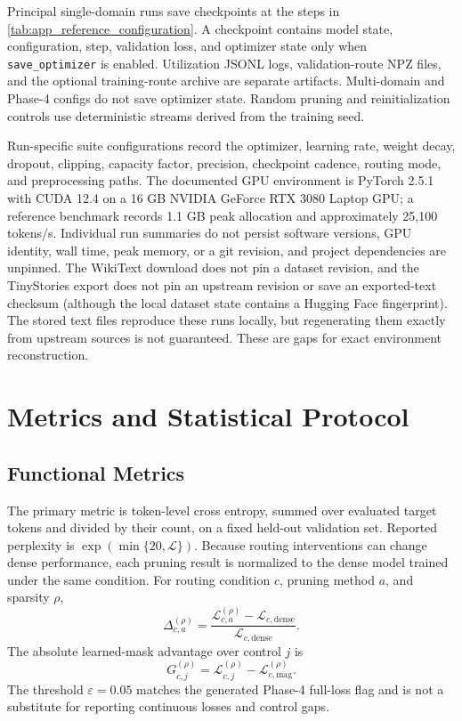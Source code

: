 \documentclass{article}
\begin{document}
Principal single-domain runs save checkpoints at the steps in
\cref{tab:app_reference_configuration}. A checkpoint contains model state,
configuration, step, validation loss, and optimizer state only when
\texttt{save\_optimizer} is enabled. Utilization JSONL logs, validation-route
NPZ files, and the optional training-route archive are separate artifacts.
Multi-domain and Phase-4 configs do not save optimizer state. Random pruning and
reinitialization controls use deterministic streams derived from the training
seed.

Run-specific suite configurations record the optimizer, learning rate, weight
decay, dropout, clipping, capacity factor, precision, checkpoint cadence,
routing mode, and preprocessing paths. The documented GPU environment is
PyTorch 2.5.1 with CUDA 12.4 on a 16 GB NVIDIA GeForce RTX 3080 Laptop GPU; a
reference benchmark records 1.1 GB peak allocation and approximately 25,100
tokens/s. Individual run summaries do not persist software versions, GPU
identity, wall time, peak memory, or a git revision, and project dependencies
are unpinned. The WikiText download does not pin a dataset revision, and the
TinyStories export does not pin an upstream revision or save an exported-text
checksum (although the local dataset state contains a Hugging Face
fingerprint). The
stored text files reproduce these runs locally, but regenerating them exactly
from upstream sources is not guaranteed. These are gaps for exact environment
reconstruction.

\section{Metrics and Statistical Protocol}
\label{app:metrics}

\subsection{Functional Metrics}

The primary metric is token-level cross entropy, summed over evaluated target
tokens and divided by their count, on a fixed held-out validation set. Reported
perplexity is $\exp(\min\{20,\mathcal L\})$. Because routing interventions can
change dense performance, each pruning
result is normalized to the dense model trained under the same condition. For
routing condition $c$, pruning method $a$, and sparsity $\rho$,
\begin{equation}
\Delta_{c,a}^{(\rho)}
=
\frac{
\mathcal{L}_{c,a}^{(\rho)}
-
\mathcal{L}_{c,\mathrm{dense}}
}{
\mathcal{L}_{c,\mathrm{dense}}
}.
\label{eq:app_relative_gap}
\end{equation}
The absolute learned-mask advantage over control $j$ is
\begin{equation}
G_{c,j}^{(\rho)}
=
\mathcal{L}_{c,j}^{(\rho)}
-
\mathcal{L}_{c,\mathrm{mag}}^{(\rho)}.
\label{eq:app_control_gap}
\end{equation}
The threshold $\varepsilon=0.05$ matches the generated Phase-4 full-loss flag
and is not a substitute for reporting continuous losses and control gaps.
\end{document}
